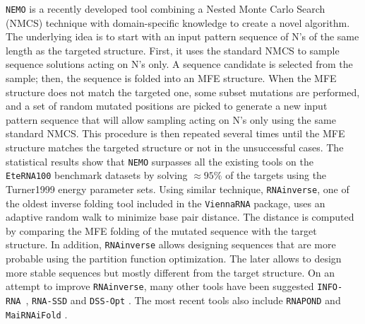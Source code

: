 \texttt{NEMO} \cite{nemo2018} is a recently developed tool combining a Nested Monte Carlo Search (NMCS) technique with domain-specific knowledge to create a novel algorithm. The underlying idea is to start with an input pattern sequence of N's of the same length as the targeted structure. First, it uses the standard NMCS to sample sequence solutions acting on N's only. A sequence candidate is selected from the sample; then, the sequence is folded into an MFE structure. When the MFE structure does not match the targeted one, some subset mutations are performed, and a set of random mutated positions are picked to generate a new input pattern sequence that will allow sampling acting on N's only using the same standard NMCS. This procedure is then repeated several times until the MFE structure matches the targeted structure or not in the unsuccessful cases. The statistical results show that \texttt{NEMO} surpasses all the existing tools on the \texttt{EteRNA100} benchmark datasets by solving $\approx95\%$ of the targets using the Turner1999 energy parameter sets. Using similar technique, \texttt{RNAinverse}\cite{lorenz2011viennarna}, one of the oldest inverse folding tool included in the \texttt{ViennaRNA} package, uses an adaptive random walk to minimize base pair distance.  The distance is computed by comparing the MFE folding of the mutated sequence with the target structure. In addition, \texttt{RNAinverse} allows designing sequences that are more probable using the partition function optimization. The later allows to design more stable sequences but mostly different from the target structure. On an attempt to improve \texttt{RNAinverse}, many other tools have been suggested \texttt{INFO-RNA} \cite{busch2006info}, \texttt{RNA-SSD} \cite{andronescu2004new} and \texttt{DSS-Opt} \cite{matthies2012dynamics}. The most recent tools also include \texttt{RNAPOND} \cite{yao2021taming} and \texttt{MaiRNAiFold} \cite{minuesa2021moirnaifold}.

